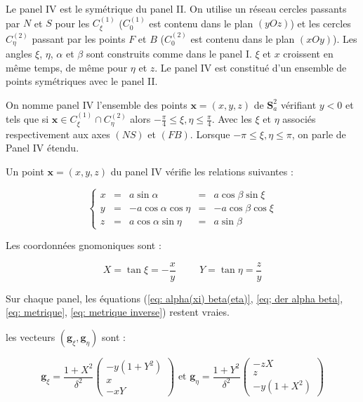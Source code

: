 Le panel IV est le symétrique du panel II. On utilise un réseau cercles passants par $N$ et $S$ pour les $C_{\xi}^{(1)}$ ($C_{0}^{(1)}$ est contenu dans le plan $(yOz)$) et les cercles $C_{\eta}^{(2)}$ passant par les points $F$ et $B$ ($C_{0}^{(2)}$ est contenu dans le plan $(xOy)$). Les angles $\xi$, $\eta$, $\alpha$ et $\beta$ sont construits comme dans le panel I. $\xi$ et $x$ croissent en même temps, de même pour $\eta$ et $z$. Le panel IV est constitué d'un ensemble de points symétriques avec le panel II.

\begin{definition}
On nomme panel IV l'ensemble des points $\mathbf{x}=(x,y,z)$ de $\mathbf{S}_a^2$ vérifiant $y<0$ et tels que si $\mathbf{x} \in C_{\xi}^{(1)} \cap C_{\eta}^{(2)}$ alors $-\frac{\pi}{4}\leq \xi,\eta \leq \frac{\pi}{4}$. Avec les $\xi$ et $\eta$ associés respectivement aux axes $(NS)$ et $(FB)$. Lorsque $-\pi \leq \xi,\eta \leq \pi$, on parle de Panel IV étendu.
\end{definition}

Un point $\mathbf{x}=(x,y,z)$ du panel IV vérifie les relations suivantes :

\begin{equation}
\left\lbrace
\begin{array}{rcccc}
x & = & a \sin \alpha & = & a \cos \beta \sin \xi \\
y & = & - a \cos \alpha \cos \eta & = & - a \cos \beta \cos \xi \\
z & = & a \cos \alpha \sin \eta & = & a \sin \beta
\end{array}
\right.
\end{equation}

Les coordonnées gnomoniques sont :

\begin{equation}
X = \tan \xi = - \dfrac{x}{y} \hspace{1cm} Y = \tan \eta = \dfrac{z}{y}
\end{equation}

Sur chaque panel, les équations (\ref{eq: alpha(xi) beta(eta)}, \ref{eq; der alpha beta}, \ref{eq: metrique}, \ref{eq: metrique inverse}) restent vraies. 

les vecteurs $\left( \mathbf{g}_{\xi}, \mathbf{g}_{\eta} \right)$ sont :

\begin{equation}
\mathbf{g}_{\xi} = \dfrac{1+X^2}{\delta^2} \begin{pmatrix}
-y(1+Y^2) \\ x \\ -xY
\end{pmatrix} \text{ et } \mathbf{g}_{\eta} = \dfrac{1+Y^2}{\delta^2} \begin{pmatrix}
-zX \\ z \\ -y(1+X^2)
\end{pmatrix}
\label{eq: base locale IV}
\end{equation}

